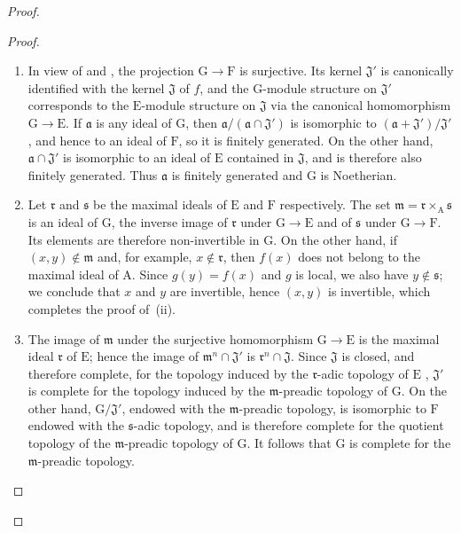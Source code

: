 \begin{proof}
\begin{proof}
\begin{enumerate}[label=(\roman*)]
  \item In view of  and , the projection $\mathrm{G}\to\mathrm{F}$ is surjective. Its kernel $\mathfrak{J}'$ is canonically identified with the kernel $\mathfrak{J}$ of $f$, and the $\mathrm{G}$-module structure on $\mathfrak{J}'$ corresponds to the $\mathrm{E}$-module structure on $\mathfrak{J}$ via the canonical homomorphism $\mathrm{G}\to\mathrm{E}$.
If $\mathfrak{a}$ is any ideal of $\mathrm{G}$, then $\mathfrak{a}/(\mathfrak{a}\cap\mathfrak{J}')$ is isomorphic to $(\mathfrak{a}+\mathfrak{J}')/\mathfrak{J}'$, and hence to an ideal of $\mathrm{F}$, so it is finitely generated. On the other hand, $\mathfrak{a}\cap\mathfrak{J}'$ is isomorphic to an ideal of $\mathrm{E}$ contained in $\mathfrak{J}$, and is therefore also finitely generated. Thus $\mathfrak{a}$ is finitely generated and $\mathrm{G}$ is Noetherian.
  \item Let $\mathfrak{r}$ and $\mathfrak{s}$ be the maximal ideals of $\mathrm{E}$ and $\mathrm{F}$ respectively. The set $\mathfrak{m}=\mathfrak{r}\times_{\mathrm{A}}\mathfrak{s}$ is an ideal of $\mathrm{G}$, the inverse image of $\mathfrak{r}$ under $\mathrm{G}\to\mathrm{E}$ and of $\mathfrak{s}$ under $\mathrm{G}\to\mathrm{F}$. Its elements are therefore non-invertible in $\mathrm{G}$.
On the other hand, if $(x,y)\notin\mathfrak{m}$ and, for example, $x\notin\mathfrak{r}$, then $f(x)$ does not belong to the maximal ideal of $\mathrm{A}$. Since $g(y)=f(x)$ and $g$ is local, we also have $y\notin\mathfrak{s}$; we
conclude that $x$ and $y$ are invertible, hence $(x,y)$ is invertible, which completes the proof of~(ii).
  \item The image of $\mathfrak{m}$ under the surjective homomorphism $\mathrm{G}\to\mathrm{E}$ is the maximal ideal $\mathfrak{r}$ of $\mathrm{E}$; hence the image of $\mathfrak{m}^n\cap\mathfrak{J}'$ is $\mathfrak{r}^n\cap\mathfrak{J}$. Since $\mathfrak{J}$ is closed, and therefore complete, for the topology induced by the $\mathfrak{r}$-adic topology of $\mathrm{E}$ , $\mathfrak{J}'$ is complete for the topology induced by the $\mathfrak{m}$-preadic topology of $\mathrm{G}$.
On the other hand, $\mathrm{G}/\mathfrak{J}'$, endowed with the $\mathfrak{m}$-preadic topology, is isomorphic to $\mathrm{F}$ endowed with the $\mathfrak{s}$-adic topology, and is therefore complete for the quotient topology of the $\mathfrak{m}$-preadic topology of $\mathrm{G}$.
It follows that $\mathrm{G}$ is complete for the $\mathfrak{m}$-preadic topology.
\end{enumerate}
\end{proof}


\end{proof}

